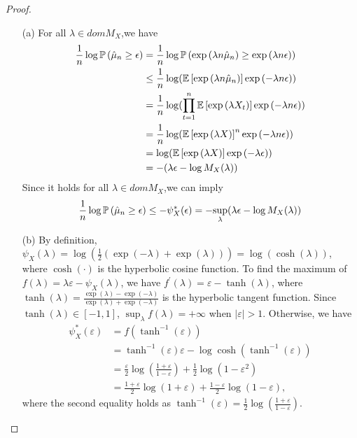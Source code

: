 \begin{proof}
\begin{enumerate}
	\item[(a)] For all $\lambda\in domM_X$,we have 
	    \begin{align*}
	        \frac{1}{n}\log\mathbb{P} \left(\hat{\mu}_n\geq\epsilon\right)&=\frac{1}{n}\log\mathbb{P} \left(\exp{(\lambda n\hat{\mu}_n)}\geq\exp{(\lambda n \epsilon)}\right)\\
	        &\leq \frac{1}{n}\log(\mathbb{E} \left[\exp{(\lambda n\hat{\mu}_n)}\right]\exp{(-\lambda n \epsilon)})\\
	        &=\frac{1}{n}\log(\prod_{t=1}^n\mathbb{E} \left[\exp{(\lambda X_t)}\right]\exp{(-\lambda n \epsilon)})\\
	        &=\frac{1}{n}\log(\mathbb{E} \left[\exp{(\lambda X)}\right]^n\exp{(-\lambda n \epsilon)})\\
	        &=\log(\mathbb{E} \left[\exp{(\lambda X)}\right]\exp{(-\lambda\epsilon)})\\
	        &=-(\lambda\epsilon-\log M_X(\lambda))
	    \end{align*}
        Since it holds for all $\lambda\in domM_X$,we can imply
        \begin{align*}
            \frac{1}{n}\log\mathbb{P} \left(\hat{\mu}_n\geq\epsilon\right)\leq -\psi_X^{\ast}(\epsilon)=-\underset{\lambda}{\sup}(\lambda\epsilon-\log M_X(\lambda))
        \end{align*}

	\item[(b)] By definition, $\psi_{X}(\lambda)=\log(\frac{1}{2}(\exp (-\lambda)+\exp (\lambda)))= \log(\cosh (\lambda))$, where $\cosh(\cdot)$ is the hyperbolic cosine function.
	To find the maximum of $f(\lambda) = \lambda \varepsilon - \psi_{X}(\lambda)$, we have $f^\prime(\lambda) = \varepsilon - \tanh(\lambda)$, where $\tanh(\lambda) = \frac{\exp(\lambda) - \exp(-\lambda)}{\exp(\lambda) + \exp(-\lambda)}$ is the hyperbolic tangent function.
	Since $\tanh(\lambda) \in[-1,1]$, $\sup _{\lambda} f(\lambda)=+\infty$ when $|\varepsilon|>1$.
	Otherwise, we have
	\begin{equation*}
		\begin{aligned}
			\psi_{X}^{*}(\varepsilon)
			&=f\left(\tanh ^{-1}(\varepsilon)\right)\\
			&=\tanh ^{-1}(\varepsilon) \varepsilon-\log \cosh \left(\tanh ^{-1}(\varepsilon)\right)\\
			&=\frac{\varepsilon}{2} \log \left(\frac{1+\varepsilon}{1-\varepsilon}\right)+\frac{1}{2} \log \left(1-\varepsilon^{2}\right)\\
			&=\frac{1+\varepsilon}{2} \log (1+\varepsilon)+\frac{1-\varepsilon}{2} \log (1-\varepsilon),
		\end{aligned}
	\end{equation*}
	where the second equality holds as $\tanh ^{-1}(\varepsilon)=\frac{1}{2} \log \left(\frac{1+\varepsilon}{1-\varepsilon}\right)$.
\end{enumerate}
\end{proof}


